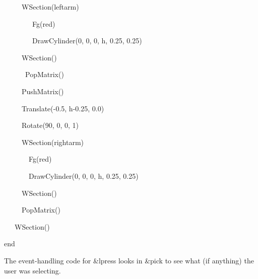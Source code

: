 \documentclass[letterpaper]{article}
\begin{document}
{\sffamily
\ \ \ \ \  WSection({\textquotedbl}leftarm{\textquotedbl})}

{\sffamily
\ \ \ \ \  \ \ \ Fg({\textquotedbl}red{\textquotedbl})}

{\sffamily
\ \ \ \ \  \ \ \ DrawCylinder(0, 0, 0, h, 0.25, 0.25)}

{\sffamily
\ \ \ \ \  WSection()}

{\sffamily
\ \ \ \ \ \ PopMatrix()}

{\sffamily
\ \ \ \ \ PushMatrix()}

{\sffamily
\ \ \ \ \ Translate(-0.5, h-0.25, 0.0)}

{\sffamily
\ \ \ \ \ Rotate(90, 0, 0, 1)}

{\sffamily
\ \ \ \ \ WSection({\textquotedbl}rightarm{\textquotedbl})}

{\sffamily
\ \ \ \ \  \ \ Fg({\textquotedbl}red{\textquotedbl})}

{\sffamily
\ \ \ \ \  \ \ DrawCylinder(0, 0, 0, h, 0.25, 0.25)}

{\sffamily
\ \ \ \ \ WSection()}

{\sffamily
\ \ \ \ \ PopMatrix()}

{\sffamily
\ \ \ WSection()}

{\sffamily
end}


\bigskip

The event-handling code for \textsf{\&lpress} looks in \textsf{\&pick}
to see what (if anything) the user was selecting.

\bigskip
\end{document}
